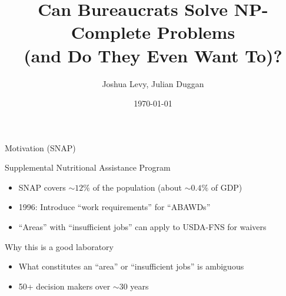 \documentclass[aspectratio=169, 11pt]{beamer}
\title{Can Bureaucrats Solve NP-Complete Problems\\ (and Do They Even Want To)?}
\author{Joshua Levy, Julian Duggan}
\institute{University of Southern California}
\date{\today}
\begin{document}
\maketitle

\begin{frame}{Motivation (SNAP)}

  \begin{block}{Supplemental Nutritional Assistance Program}
    \begin{itemize}
      \item SNAP covers $\sim 12\%$ of the population (about $\sim 0.4\%$ of GDP)
      \item 1996: Introduce ``work requirements'' for ``ABAWDs''
      \item ``Areas'' with ``insufficient jobs'' can apply to USDA-FNS for waivers
    \end{itemize}
  \end{block}

  \begin{block}{Why this is a good laboratory}
    \begin{itemize}
      \item What constitutes an ``area'' or ``insufficient jobs'' is ambiguous
      \item 50+ decision makers over $\sim$30 years
    \end{itemize}
  \end{block}
\end{frame}
\end{document}
